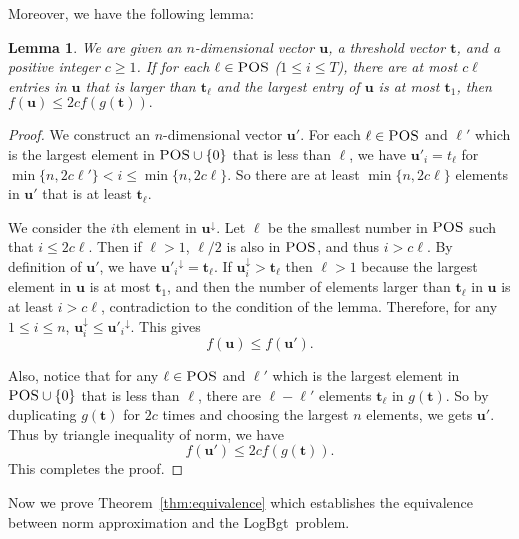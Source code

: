 \documentclass[11pt,a4paper]{article} \usepackage{enumitem}
\newcommand{\da}{\downarrow}
\newcommand{\boldu}{\boldsymbol{u}}
\newcommand{\boldt}{\boldsymbol{t}}
\newcommand{\LBO}{\textsf{LogBgt}}
\newcommand{\POS}{\textsc{POS}}
\newtheorem{lemma}[theorem]{Lemma}
\theoremstyle{definition}
\begin{document}
Moreover, we have the following lemma:
\begin{lemma}
\label{lem:d-3}
We are given an $n$-dimensional vector $\boldu$,
a threshold vector $\boldt$, and 
a positive integer $c\geq 1$.
If for each $\ell\in \POS$ ($1\leq i\leq T$), there are at most $c\ell$ entries in 
$\boldu$ that is larger than $\boldt_\ell$ and the largest entry of $\boldu$
is at most $\boldt_1$, then $f(\boldu)\leq 2cf(g(\boldt)).$
\end{lemma}
\begin{proof}
We construct an $n$-dimensional vector $\boldu'$. 
For each $\ell\in \POS$ and $\ell'$ which is the largest element in $\POS\cup \{0\}$ that is less than $\ell$,
we have $\boldu'_i=t_\ell$ for $\min\{n,2c\ell'\}<i\leq \min\{n,2c\ell\}$.
So there are at least
$\min\{n,2c\ell\}$ elements in $\boldu'$ that is at least $\boldt_\ell$.


We consider the $i$th element in $\boldu^\da$. Let $\ell$ be the smallest number in $\POS$ such that $i\leq 2c\ell$.
Then if $\ell>1$, $\ell/2$ is also in $\POS$, and thus $i>c\ell$.
By definition of $\boldu'$, we have ${\boldu'_i}^\da=\boldt_\ell$.
If $\boldu^\da_i>\boldt_\ell$
then $\ell>1$ because the largest element in $\boldu$ is at most $\boldt_1$, and then the number of elements larger than $\boldt_\ell$ in $\boldu$ is at least $i>c\ell$, contradiction to the condition of the lemma.
Therefore, for any $1\leq i\leq n$, $\boldu_i^\da\leq {\boldu'_i}^\da$. This gives
$$f(\boldu)\leq f(\boldu').$$

Also, notice that for any $\ell\in\POS$ and $\ell'$ which is the largest element in $\POS\cup \{0\}$ that is less than $\ell$, there are $\ell-\ell'$ elements $\boldt_\ell$ in $g(\boldt)$.
So by duplicating $g(\boldt)$ for $2c$ times and choosing the largest $n$ elements, we gets $\boldu'$. Thus by triangle inequality of norm, we have $$f(\boldu')\leq 2cf(g(\boldt)).
$$
This completes the proof.
\end{proof}

Now we prove Theorem~\ref{thm:equivalence}
which establishes
the equivalence between norm approximation and
the \LBO\ problem.
\end{document}
